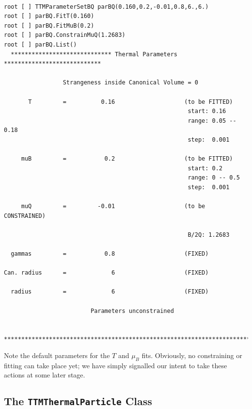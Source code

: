 \documentclass{elsarticle}
\begin{document}
\small
\begin{verbatim}

root [ ] TTMParameterSetBQ parBQ(0.160,0.2,-0.01,0.8,6.,6.)
root [ ] parBQ.FitT(0.160)
root [ ] parBQ.FitMuB(0.2)
root [ ] parBQ.ConstrainMuQ(1.2683)
root [ ] parBQ.List()
  ***************************** Thermal Parameters ****************************

                 Strangeness inside Canonical Volume = 0

       T         =          0.16                    (to be FITTED)
                                                     start: 0.16
                                                     range: 0.05 -- 0.18
                                                     step:  0.001

     muB         =           0.2                    (to be FITTED)
                                                     start: 0.2
                                                     range: 0 -- 0.5
                                                     step:  0.001

     muQ         =         -0.01                    (to be CONSTRAINED)

                                                     B/2Q: 1.2683

  gammas         =           0.8                    (FIXED)

Can. radius      =             6                    (FIXED)

  radius         =             6                    (FIXED)

                         Parameters unconstrained

  ******************************************************************************

\end{verbatim}
\normalsize

\noindent
Note the default parameters for the $T$ and $\mu_B$ fits. Obviously, no constraining or fitting can 
take place yet; we have simply signalled our intent to take these actions at some later stage.

\subsection{The \texttt{TTMThermalParticle} Class}
\end{document}
